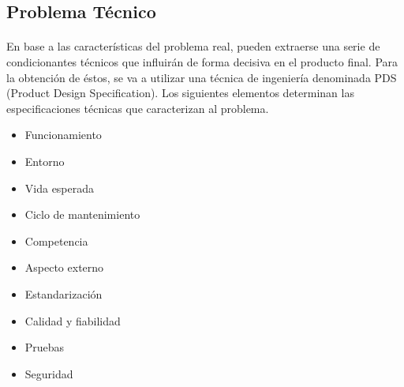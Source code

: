 \subsection{Problema Técnico}

\paragraph{}En base a las características del problema real, pueden extraerse
una serie de condicionantes técnicos que influirán de forma decisiva en el
producto final. Para la obtención de éstos, se va a utilizar una técnica de
ingeniería denominada PDS (Product Design Specification). Los siguientes
elementos determinan las especificaciones técnicas que caracterizan al problema.

\begin{itemize}
 \item Funcionamiento
 \item Entorno
 \item Vida esperada
 \item Ciclo de mantenimiento
 \item Competencia
 \item Aspecto externo
 \item Estandarización
 \item Calidad y fiabilidad
 \item Pruebas
 \item Seguridad
\end{itemize}
